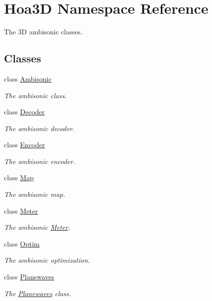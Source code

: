 \hypertarget{namespace_hoa3_d}{\section{Hoa3\-D Namespace Reference}
\label{namespace_hoa3_d}
}


The 3\-D ambisonic classes.  


\subsection*{Classes}
\begin{DoxyCompactItemize}
\item 
class \hyperlink{class_hoa3_d_1_1_ambisonic}{Ambisonic}
\begin{DoxyCompactList}\small\item\em The ambisonic class. \end{DoxyCompactList}\item 
class \hyperlink{class_hoa3_d_1_1_decoder}{Decoder}
\begin{DoxyCompactList}\small\item\em The ambisonic decoder. \end{DoxyCompactList}\item 
class \hyperlink{class_hoa3_d_1_1_encoder}{Encoder}
\begin{DoxyCompactList}\small\item\em The ambisonic encoder. \end{DoxyCompactList}\item 
class \hyperlink{class_hoa3_d_1_1_map}{Map}
\begin{DoxyCompactList}\small\item\em The ambisonic map. \end{DoxyCompactList}\item 
class \hyperlink{class_hoa3_d_1_1_meter}{Meter}
\begin{DoxyCompactList}\small\item\em The ambisonic \hyperlink{class_hoa3_d_1_1_meter}{Meter}. \end{DoxyCompactList}\item 
class \hyperlink{class_hoa3_d_1_1_optim}{Optim}
\begin{DoxyCompactList}\small\item\em The ambisonic optimization. \end{DoxyCompactList}\item 
class \hyperlink{class_hoa3_d_1_1_planewaves}{Planewaves}
\begin{DoxyCompactList}\small\item\em The \hyperlink{class_hoa3_d_1_1_planewaves}{Planewaves} class. \end{DoxyCompactList}\item 

\end{DoxyCompactItemize}
